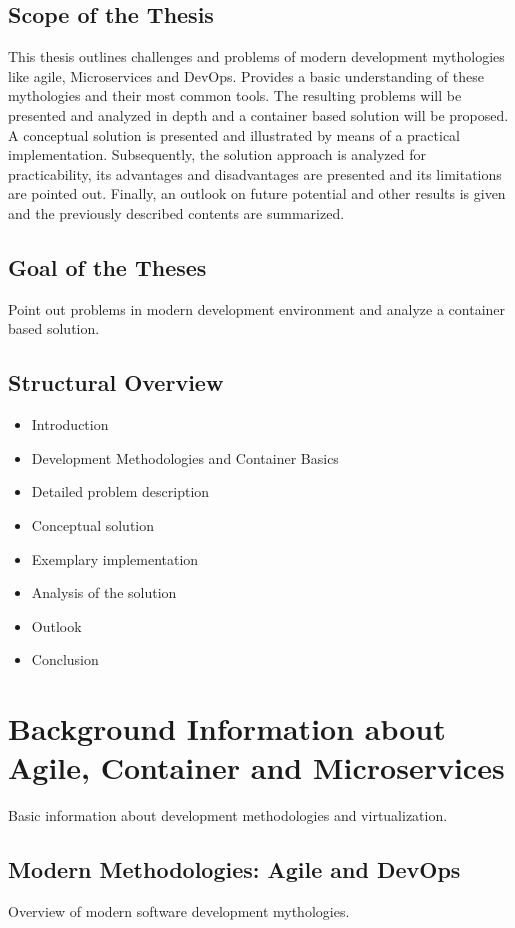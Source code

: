\documentclass[12pt, a4paper]{article}
\begin{document}
    \subsection{Scope of the Thesis}
    This thesis outlines challenges and problems of modern development mythologies like agile, Microservices and DevOps. Provides a basic understanding of these mythologies and their most common tools. The resulting problems will be presented and analyzed in depth and a container based solution will be proposed. A conceptual solution is presented and illustrated by means of a practical implementation. Subsequently, the solution approach is analyzed for practicability, its advantages and disadvantages are presented and its limitations are pointed out. Finally, an outlook on future potential and other results is given and the previously described contents are summarized.
    \subsection{Goal of the Theses}
    Point out problems in modern development environment and analyze a container based solution.
    \subsection{Structural Overview}
    \begin{itemize}
        \setlength\itemsep{0em}
        \item Introduction
        \item Development Methodologies and Container Basics
        \item Detailed problem description
        \item Conceptual solution
        \item Exemplary implementation
        \item Analysis of the solution
        \item Outlook
        \item Conclusion
    \end{itemize}

\section{Background Information about Agile, Container and Microservices}\label{sec::backgrund}
Basic information about development methodologies and virtualization.
    \subsection{Modern Methodologies: Agile and DevOps }\label{ssec::devops}
    Overview of modern software development mythologies.
\end{document}
